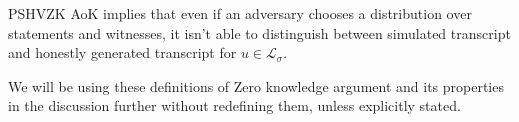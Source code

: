PSHVZK AoK implies that even if an adversary chooses a
distribution over statements and witnesses, it isn't able to
distinguish between simulated transcript and honestly generated
transcript for $u \in \mathcal{L}_{\sigma}$.

We will be using these definitions of Zero knowledge argument and its properties in the discussion further without redefining them, unless explicitly stated.




